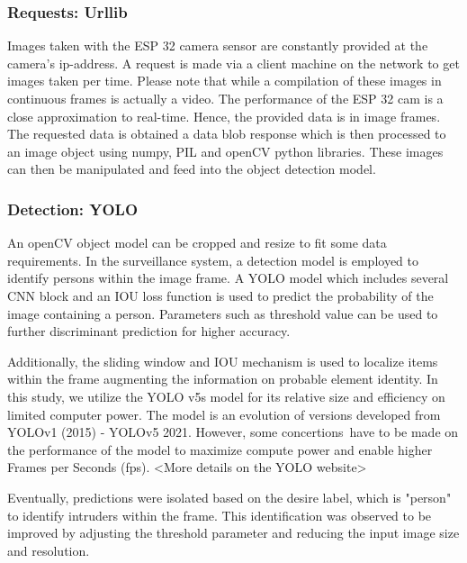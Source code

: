 \documentclass[../../main.tex]{subfiles}
\begin{document}
                \subsubsection{Requests: Urllib}
                    Images taken with the ESP 32 camera sensor are constantly provided at the camera's ip-address. A request is made via a client machine on the network to get images taken per time. Please note that while a compilation of these images in continuous frames is actually a video. The performance of the ESP 32 cam is a close approximation to real-time. Hence, the provided data is in image frames. The requested data is obtained a data blob response which is then processed to an image object using numpy, PIL and openCV python libraries. These images can then be manipulated and feed into the object detection model.
                
                \subsubsection{Detection: YOLO}
                    An openCV object model can be cropped and resize to fit some data requirements. In the surveillance system, a detection model is employed to identify persons within the image frame. A YOLO model which includes several CNN block and an IOU loss function is used to predict the probability of the image containing a person. Parameters such as threshold value can be used to further discriminant prediction for higher accuracy.

                    Additionally, the sliding window and IOU mechanism is used to localize items within the frame augmenting the information on probable element identity. In this study, we utilize the YOLO v5s model for its relative size and efficiency on limited computer power. The model is an evolution of versions developed from YOLOv1 (2015) - YOLOv5 2021. However, some concertions have to be made on the performance of the model to maximize compute power and enable higher Frames per Seconds (fps). <More details on the YOLO website>
                    
                    Eventually, predictions were isolated based on the desire label, which is "person" to identify intruders within the frame. This identification was observed to be improved by adjusting the threshold parameter and reducing the input image size and resolution.
                
\end{document}
